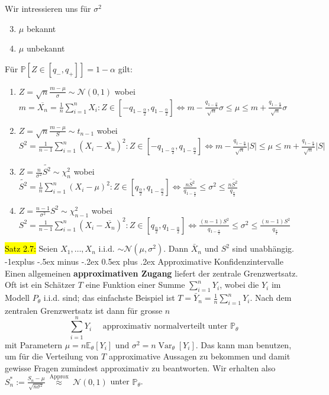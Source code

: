 \documentclass[10pt,landscape]{article}
\makeatletter
\newcommand{\yellow}[1]{\sethlcolor{yellow} \hl{#1}}
\renewcommand{\subsection}{\@startsection{subsection}{1}{0mm}%
                                {-1ex plus -.5ex minus -.2ex}%
                                {0.5ex plus .2ex}%
                                {\normalfont\large\bfseries}}
\renewcommand{\subsection}{\@startsection{subsection}{2}{0mm}%
                                {-1explus -.5ex minus -.2ex}%
                                {0.5ex plus .2ex}%
                                {\normalfont\normalsize\bfseries}}
\makeatother
\begin{document}
\begin{multicols}{3}
Wir intressieren uns für \textbf{$\sigma^2$}
\begin{enumerate}
    \setcounter{enumi}{2}
    \item $\mu$ bekannt
    \item $\mu$ unbekannt
\end{enumerate}

Für $\mathbb{P}[Z \in [q_{-}, q_{+}]] = 1 - \alpha$ gilt:
\begin{enumerate}
    \item $Z = \sqrt{n}\frac{m - \mu}{\sigma} \sim \mathcal{N}\left(0, 1\right)$ wobei $m = \overline{X_n} = \frac{1}{n}\sum_{i = 1}^nX_i: Z \in [-q_{1-\frac{\alpha}{2}}, q_{1-\frac{\alpha}{2}}] \iff
    m - \frac{q_{1-\frac{\alpha}{2}}}{\sqrt{n}}\sigma \leq \mu \leq m +\frac{q_{1-\frac{\alpha}{2}}}{\sqrt{n}}\sigma$
    \item $Z = \sqrt{n}\frac{m - \mu}{S} \sim t_{n - 1}$ wobei $S^2 =  \frac{1}{n - 1}\sum_{i = 1}^n(X_i - \overline{X_n})^2: Z \in [-q_{1-\frac{\alpha}{2}}, q_{1-\frac{\alpha}{2}}] \iff
    m - \frac{q_{1-\frac{\alpha}{2}}}{\sqrt{n}}|S| \leq \mu \leq m +\frac{q_{1-\frac{\alpha}{2}}}{\sqrt{n}}|S|$
    \item $Z = \frac{n}{\sigma^2} \tilde{S^2}\sim \chi^{2}_{n}$ wobei $\tilde{S^2} =  \frac{1}{n}\sum_{i = 1}^n(X_i - \mu)^2: Z \in [q_{\frac{\alpha}{2}}, q_{1-\frac{\alpha}{2}}] \iff
    \frac{n\tilde{S^2}}{q_{1-\frac{\alpha}{2}}} \leq \sigma^2 \leq \frac{n\tilde{S^2}}{q_{\frac{\alpha}{2}}}$
    \item $Z = \frac{n - 1}{\sigma^2}S^2 \sim \chi^{2}_{n - 1}$ wobei $S^2 =  \frac{1}{n - 1}\sum_{i = 1}^n(X_i - \overline{X_n})^2: Z \in [q_{\frac{\alpha}{2}}, q_{1-\frac{\alpha}{2}}] \iff
    \frac{(n - 1)S^2}{q_{1-\frac{\alpha}{2}}} \leq \sigma^2 \leq \frac{(n -1)S^2}{q_{\frac{\alpha}{2}}}$
\end{enumerate}

\yellow{Satz 2.7:} Seien $X_{1}, \ldots, X_{n}$ i.i.d. $\sim \mathcal{N}\left(\mu, \sigma^{2}\right) .$ Dann $\bar{X}_{n}$ und $S^{2}$ sind unabhängig.
\subsection{Approximative Konfidenzintervalle}
Einen allgemeinen\textbf{ approximativen Zugang} liefert der zentrale Grenzwertsatz. Oft ist ein Schätzer $T$ eine Funktion einer Summe $\sum_{i=1}^{n} Y_{i}$, wobei die $Y_{i}$ im Modell $P_{\theta}$ i.i.d. sind; das einfachste Beispiel ist $T=\bar{Y}_{n}=\frac{1}{n} \sum_{i=1}^{n} Y_{i}$. Nach dem zentralen Grenzwertsatz ist dann für grosse $n$
$$
\sum_{i=1}^{n} Y_{i} \quad \text { approximativ normalverteilt unter } \mathbb{P}_{\theta}
$$
mit Parametern $\mu=n \mathbb{E}_{\theta}\left[Y_{i}\right]$ und $\sigma^{2}=n \operatorname{Var}_{\theta}\left[Y_{i}\right]$. 
Das kann man benutzen, um für die Verteilung von $T$ approximative Aussagen zu bekommen und damit gewisse Fragen 
zumindest approximativ zu beantworten. Wir erhalten also $S_{n}^{*}:=\frac{S_{n}- \mu}{\sqrt{n \sigma^2}} \stackrel{\text { Approx }}{\approx} \mathcal{N}(0,1)$ unter $\mathbb{P}_{\theta}$.\\

\end{multicols}
\end{document}
